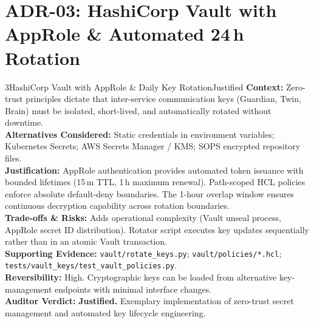 \documentclass[10pt,a4paper]{report}
\begin{document}
\section{ADR-03: HashiCorp Vault with AppRole \& Automated 24\,h Rotation}
\begin{adrbox}{3}{HashiCorp Vault with AppRole \& Daily Key Rotation}{Justified}
\textbf{Context:} Zero-trust principles dictate that inter-service communication keys (Guardian, Twin, Brain) must be isolated, short-lived, and automatically rotated without downtime.\\
\textbf{Alternatives Considered:} Static credentials in environment variables; Kubernetes Secrets; AWS Secrets Manager / KMS; SOPS encrypted repository files.\\
\textbf{Justification:} AppRole authentication provides automated token issuance with bounded lifetimes (15\,m TTL, 1\,h maximum renewal). Path-scoped HCL policies enforce absolute default-deny boundaries. The 1-hour overlap window ensures continuous decryption capability across rotation boundaries.\\
\textbf{Trade-offs \& Risks:} Adds operational complexity (Vault unseal process, AppRole secret ID distribution). Rotator script executes key updates sequentially rather than in an atomic Vault transaction.\\
\textbf{Supporting Evidence:} \texttt{vault/rotate\_keys.py}; \texttt{vault/policies/*.hcl}; \texttt{tests/vault\_keys/test\_vault\_policies.py}.\\
\textbf{Reversibility:} High. Cryptographic keys can be loaded from alternative key-management endpoints with minimal interface changes.\\
\textbf{Auditor Verdict:} \textbf{Justified.} Exemplary implementation of zero-trust secret management and automated key lifecycle engineering.
\end{adrbox}
\end{document}

